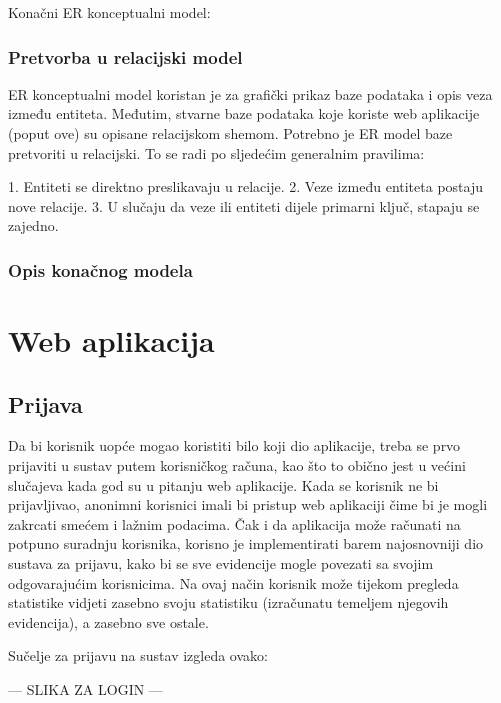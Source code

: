 \documentclass[times, utf8, zavrsni]{fer}
\begin{document}
Konačni ER konceptualni model:

\subsection{Pretvorba u relacijski model}
ER konceptualni model koristan je za grafički prikaz baze podataka i opis veza između entiteta. Međutim, stvarne baze podataka koje koriste web aplikacije (poput ove) su opisane relacijskom shemom. Potrebno je ER model baze pretvoriti u relacijski. To se radi po sljedećim generalnim pravilima:

1. Entiteti se direktno preslikavaju u relacije.
2. Veze između entiteta postaju nove relacije.
3. U slučaju da veze ili entiteti dijele primarni ključ, stapaju se zajedno.

\subsection{Opis konačnog modela}


\chapter{Web aplikacija}

\section{Prijava}
Da bi korisnik uopće mogao koristiti bilo koji dio aplikacije, treba se prvo prijaviti u sustav putem korisničkog računa, kao što to obično jest u većini slučajeva kada god su u pitanju web aplikacije. Kada se korisnik ne bi prijavljivao, anonimni korisnici imali bi pristup web aplikaciji čime bi je mogli zakrcati smećem i lažnim podacima. Čak i da aplikacija može računati na potpuno suradnju korisnika, korisno je implementirati barem najosnovniji dio sustava za prijavu, kako bi se sve evidencije mogle povezati sa svojim odgovarajućim korisnicima. Na ovaj način korisnik može tijekom pregleda statistike vidjeti zasebno svoju statistiku (izračunatu temeljem njegovih evidencija), a zasebno sve ostale.

Sučelje za prijavu na sustav izgleda ovako:

--- SLIKA ZA LOGIN ---
\end{document}
